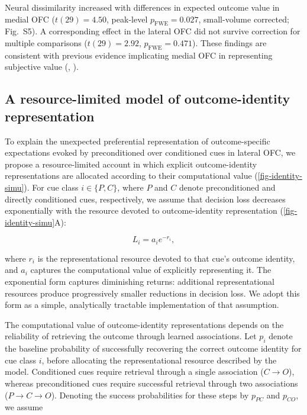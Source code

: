 \documentclass[9pt,twocolumn,twoside]{pnas-new}
\begin{document}
Neural dissimilarity increased with differences in expected outcome value in medial OFC ($t(29) = 4.50$, peak-level $p_{\mathrm{FWE}} = 0.027$, small-volume corrected; Fig.~S5). A corresponding effect in the lateral OFC did not survive correction for multiple comparisons ($t(29) = 2.92$, $p_{\mathrm{FWE}} = 0.471$). These findings are consistent with previous evidence implicating medial OFC in representing subjective value (\citealp{levy2012root,mcnamee13,howard2015identity}, \hl{\mbox{\citealp{plassmann2007orbitofrontal,fitzgerald2009role,lebreton2009automatic}}}).

\subsection*{A resource-limited model of outcome-identity representation}

To explain the unexpected preferential representation of outcome-specific expectations evoked by preconditioned over conditioned cues in lateral OFC, we propose a resource-limited account in which explicit outcome-identity representations are allocated according to their computational value (\autoref{fig-identity-simu}). For cue class $i \in \{P,C\}$, where $P$ and $C$ denote preconditioned and directly conditioned cues, respectively, we assume that decision loss decreases exponentially with the resource devoted to outcome-identity representation (\autoref{fig-identity-simu}A):


\begin{equation}
L_i = a_i e^{-r_i},
\end{equation}

where $r_i$ is the representational resource devoted to that cue's outcome identity, and $a_i$ captures the computational value of explicitly representing it. The exponential form captures diminishing returns: additional representational resources produce progressively smaller reductions in decision loss. We adopt this form as a simple, analytically tractable implementation of that assumption.

The computational value of outcome-identity representations depends on the reliability of retrieving the outcome through learned associations. Let $p_i$ denote the baseline probability of successfully recovering the correct outcome identity for cue class $i$, before allocating the representational resource described by the model. Conditioned cues require retrieval through a single association ($C \rightarrow O$), whereas preconditioned cues require successful retrieval through two associations ($P \rightarrow C \rightarrow O$). Denoting the success probabilities for these steps by $p_{PC}$ and $p_{CO}$, we assume
\end{document}
